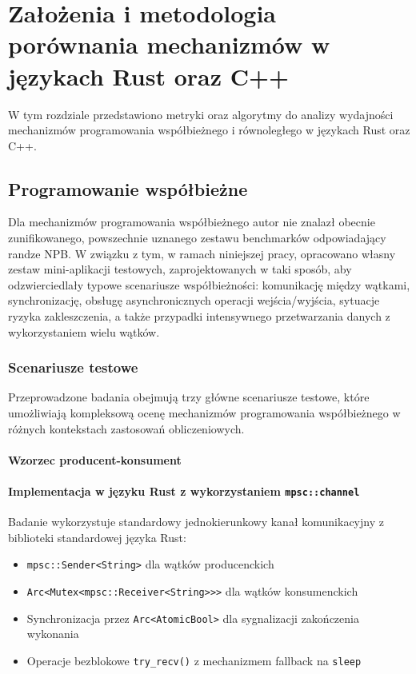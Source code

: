 \chapter{Założenia i metodologia porównania mechanizmów w językach Rust oraz C++}
W tym rozdziale przedstawiono metryki oraz algorytmy do analizy wydajności mechanizmów programowania współbieżnego i równoległego w językach Rust oraz C++. 
\section{Programowanie współbieżne}
Dla mechanizmów programowania współbieżnego autor nie znalazł obecnie zunifikowanego, powszechnie uznanego zestawu benchmarków odpowiadający randze NPB. W związku z tym, w ramach niniejszej pracy, opracowano własny zestaw mini-aplikacji testowych, zaprojektowanych w taki sposób, aby odzwierciedlały typowe scenariusze współbieżności: komunikację między wątkami, synchronizację, obsługę asynchronicznych operacji wejścia/wyjścia, sytuacje ryzyka zakleszczenia, a także przypadki intensywnego przetwarzania danych z wykorzystaniem wielu wątków.

\subsection{Scenariusze testowe}

Przeprowadzone badania obejmują trzy główne scenariusze testowe, które umożliwiają kompleksową ocenę mechanizmów programowania współbieżnego w różnych kontekstach zastosowań obliczeniowych.

\subsubsection{Wzorzec producent-konsument}

\subsubsection{Implementacja w języku Rust z wykorzystaniem \texttt{mpsc::channel}}
Badanie wykorzystuje standardowy jednokierunkowy kanał komunikacyjny z biblioteki standardowej języka Rust:
\begin{itemize}
    \item \texttt{mpsc::Sender<String>} dla wątków producenckich
    \item \texttt{Arc<Mutex<mpsc::Receiver<String>>>} dla wątków konsumenckich
    \item Synchronizacja przez \texttt{Arc<AtomicBool>} dla sygnalizacji zakończenia wykonania
    \item Operacje bezblokowe \texttt{try\_recv()} z mechanizmem fallback na \texttt{sleep}
\end{itemize}


